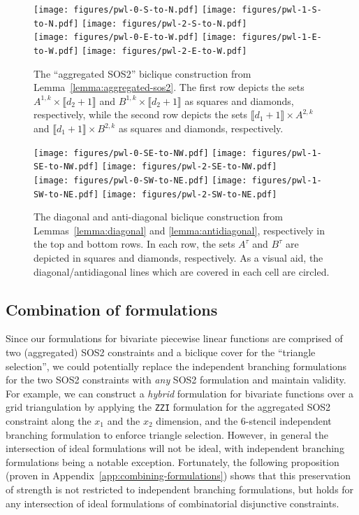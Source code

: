 \documentclass[opre,nonblindrev]{informs3} %
\newcommand{\blue}[1]{{#1}}
\newcommand{\ZZI}{\texttt{ZZI}}
\begin{document}
\begin{figure}[htpb]
    \centering
	\texttt{[image: figures/pwl-0-S-to-N.pdf]}
    \texttt{[image: figures/pwl-1-S-to-N.pdf]}
    \texttt{[image: figures/pwl-2-S-to-N.pdf]} \\
    \texttt{[image: figures/pwl-0-E-to-W.pdf]}
    \texttt{[image: figures/pwl-1-E-to-W.pdf]}
    \texttt{[image: figures/pwl-2-E-to-W.pdf]}
    \caption{The ``aggregated SOS2'' biclique construction from Lemma~\ref{lemma:aggregated-sos2}. The first row depicts the sets $A^{1,k} \times \llbracket d_2 + 1 \rrbracket$ and $B^{1,k} \times \llbracket d_2 + 1 \rrbracket$ as squares and diamonds, respectively, while the second row depicts the sets $\llbracket d_1 + 1 \rrbracket \times A^{2,k}$ and $\llbracket d_1 + 1 \rrbracket \times B^{2,k}$ as squares and diamonds, respectively.}
    \label{fig:aggregated-sos2}
    \texttt{[image: figures/pwl-0-SE-to-NW.pdf]}
    \texttt{[image: figures/pwl-1-SE-to-NW.pdf]}
    \texttt{[image: figures/pwl-2-SE-to-NW.pdf]} \\
    \texttt{[image: figures/pwl-0-SW-to-NE.pdf]}
    \texttt{[image: figures/pwl-1-SW-to-NE.pdf]}
    \texttt{[image: figures/pwl-2-SW-to-NE.pdf]}
    \caption{The diagonal and anti-diagonal biclique construction from Lemmas~\ref{lemma:diagonal} and \ref{lemma:antidiagonal}, respectively in the top and bottom rows. In each row, the sets $A^\tau$ and $B^\tau$ are depicted in squares and diamonds, respectively. As a visual aid, the diagonal/antidiagonal lines which are covered in each cell are circled.}
    \label{fig:6-stencil}
\end{figure}

\subsection{Combination of formulations}
Since our formulations for bivariate piecewise linear functions are comprised of two (aggregated) SOS2 constraints and a biclique \blue{cover} for the ``triangle selection'', we could potentially replace the independent branching formulations for the two SOS2 constraints with \emph{any} SOS2 formulation and maintain validity. For example, we can construct a \emph{hybrid} formulation for bivariate functions over a grid triangulation by applying the \ZZI{} formulation for the aggregated SOS2 constraint along the $x_1$ and the $x_2$ dimension, and the 6-stencil independent branching formulation to enforce triangle selection. However, in general the intersection of ideal formulations will not be ideal, with independent branching formulations being a notable exception. Fortunately, the following proposition (proven in Appendix~\ref{app:combining-formulations}) shows that this preservation of strength is not restricted to independent branching formulations, but holds for any intersection of ideal formulations of combinatorial disjunctive constraints.
\end{document}
